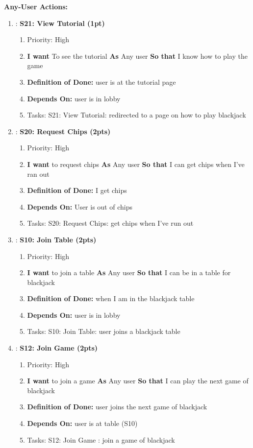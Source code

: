 \textbf{Any-User Actions:}
\begin{enumerate}[nosep]
    \item: \textbf{S21: View Tutorial (1pt)}
    \begin{enumerate}[nosep]
        \item Priority: High
        \item \textbf{I want} To see the tutorial \textbf{As} Any user \textbf{So that} I know how to play the game
        \item \textbf{Definition of Done:} user is at the tutorial page
        \item \textbf{Depends On:} user is in lobby
        \item Tasks: S21: View Tutorial: redirected to a page on how to play blackjack
    \end{enumerate}

    \item: \textbf{S20: Request Chips (2pts)}
    \begin{enumerate}[nosep]
        \item Priority: High
        \item \textbf{I want} to request chips \textbf{As} Any user \textbf{So that} I can get chips when I've ran out 
        \item \textbf{Definition of Done:} I get chips
        \item \textbf{Depends On:} User is out of chips
        \item Tasks: S20: Request Chips: get chips when I've run out 
    \end{enumerate}
    
    \item: \textbf{S10: Join Table (2pts)}
    \begin{enumerate}[nosep]
        \item Priority: High
        \item \textbf{I want} to join a table \textbf{As} Any user \textbf{So that} I can be in a table for blackjack
        \item \textbf{Definition of Done:} when I am in the blackjack table
        \item \textbf{Depends On:} user is in lobby
        \item Tasks: S10: Join Table: user joins a blackjack table
    \end{enumerate}

    \item: \textbf{S12: Join Game (2pts)}
    \begin{enumerate}[nosep]
        \item Priority: High
        \item \textbf{I want} to join a game \textbf{As} Any user \textbf{So that} I can play the next game of blackjack
        \item \textbf{Definition of Done:} user joins the next game of blackjack
        \item \textbf{Depends On:} user is at table (S10)
        \item Tasks: S12: Join Game : join a game of blackjack
    \end{enumerate}


\end{enumerate}
